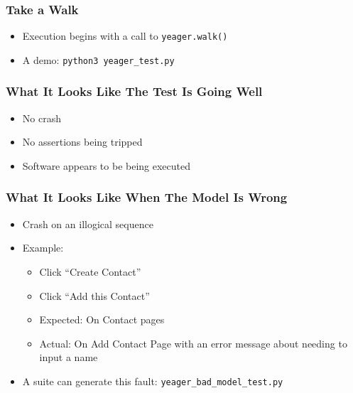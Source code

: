 \begin{frame}
  \frametitle{Take a Walk}
  \begin{itemize}
    \item Execution begins with a call to \texttt{yeager.walk()}
    \item A demo: \texttt{python3 yeager\_test.py} %
  \end{itemize}
\end{frame}

\begin{frame}
  \frametitle{What It Looks Like The Test Is Going Well}
  \begin{itemize}
    \item No crash
    \item No assertions being tripped
    \item Software appears to be being executed
  \end{itemize}
\end{frame}

\begin{frame}
  \frametitle{What It Looks Like When The Model Is Wrong}
  \begin{itemize}
    \item Crash on an illogical sequence
    \item Example:
    \begin{itemize}
      \item Click ``Create Contact''
      \item Click ``Add this Contact''
      \item Expected: On Contact pages
      \item Actual: On Add Contact Page with an error message about needing to input a name
    \end{itemize}
    \item A suite can generate this fault: \texttt{yeager\_bad\_model\_test.py} %
  \end{itemize}
\end{frame}

